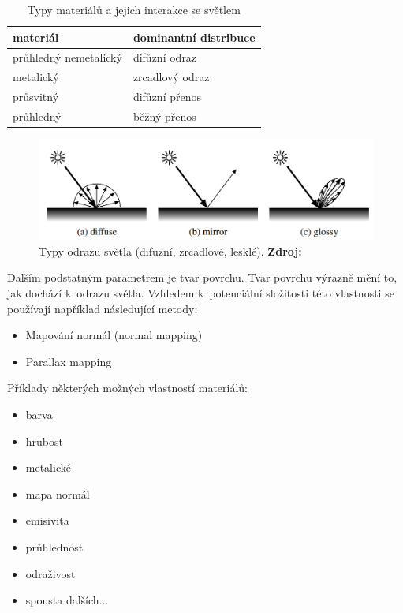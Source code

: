 \begin{table}[H]
	\centering
	\begin{tabular}{|l|l|}
		\hline
		materiál              & dominantní distribuce \\ \hline
		průhledný nemetalický & difůzní odraz         \\ \hline
		metalický             & zrcadlový odraz       \\ \hline
		průsvitný             & difůzní přenos        \\ \hline
		průhledný             & běžný přenos          \\ \hline
	\end{tabular}
	\caption{Typy materiálů a jejich interakce se světlem}
\end{table}

\begin{figure}[H]
	\centering
	\includegraphics[scale=1]{obrazky-figures/reflection_types.png}
	\caption{Typy odrazu světla (difuzní, zrcadlové, lesklé). \textbf{Zdroj: \cite{materials}}}
	\label{fig:3d_grid}
\end{figure}

Dalším podstatným parametrem je tvar povrchu. Tvar povrchu výrazně mění to, jak dochází k~odrazu světla. Vzhledem k~potenciální složitosti této vlastnosti se používají například následující metody:

\begin{itemize}
	\item Mapování normál (normal mapping)
	\item Parallax mapping
\end{itemize}

Příklady některých možných vlastností materiálů:

\begin{itemize}
	\item barva
	\item hrubost
	\item metalické
	\item mapa normál
	\item emisivita
	\item průhlednost
	\item odraživost
	\item spousta dalších...
\end{itemize}



